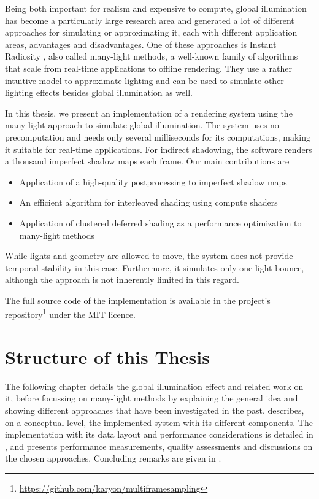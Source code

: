 Being both important for realism and expensive to compute, global illumination has become a particularly large research area and generated a lot of different approaches for simulating or approximating it, each with different application areas, advantages and disadvantages. One of these approaches is Instant Radiosity \citep{Keller:1997:InstantRadiosity}, also called many-light methods, a well-known family of algorithms that scale from real-time applications to offline rendering. They use a rather intuitive model to approximate lighting and can be used to simulate other lighting effects besides global illumination as well.

In this thesis, we present an implementation of a rendering system using the many-light approach to simulate global illumination. The system uses no precomputation and needs only several milliseconds for its computations, making it suitable for real-time applications. For indirect shadowing, the software renders a thousand imperfect shadow maps \citep{ritschel2008ism} each frame. Our main contributions are
\begin{itemize}
    \item Application of a high-quality postprocessing to imperfect shadow maps
    \item An efficient algorithm for interleaved shading \citep{Keller:2001:InterleavedSampling} using compute shaders
    \item Application of clustered deferred shading \citep{olsson2012clustered} as a performance optimization to many-light methods
\end{itemize}

While lights and geometry are allowed to move, the system does not provide temporal stability in this case. Furthermore, it simulates only one light bounce, although the approach is not inherently limited in this regard.

The full source code of the implementation is available in the project's repository\footnote{\url{https://github.com/karyon/multiframesampling}} under the MIT licence.

\section{Structure of this Thesis}

The following chapter details the global illumination effect and related work on it, before focussing on many-light methods by explaining the general idea and showing different approaches that have been investigated in the past.  describes, on a conceptual level, the implemented system with its different components. The implementation with its data layout and performance considerations is detailed in , and  presents performance measurements, quality assessments and discussions on the chosen approaches. Concluding remarks are given in .


\cleardoublepage
